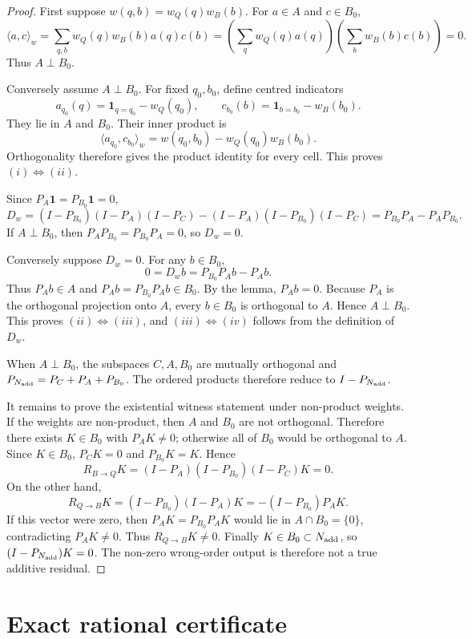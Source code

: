 \documentclass[11pt]{article}
\theoremstyle{remark}
\newcommand{\one}{\mathbf{1}}
\newcommand{\ip}[2]{\langle #1,#2\rangle_w}
\newcommand{\RQBt}{R_{Q\to B}}
\newcommand{\RBQt}{R_{B\to Q}}
\begin{document}
\begin{proof}
First suppose $w(q,b)=w_Q(q)w_B(b)$. For $a\in A$ and $c\in B_0$,
\[
\ip{a}{c}=\sum_{q,b}w_Q(q)w_B(b)a(q)c(b)
=\left(\sum_q w_Q(q)a(q)\right)
\left(\sum_b w_B(b)c(b)\right)=0.
\]
Thus $A\perp B_0$.

Conversely assume $A\perp B_0$. For fixed $q_0,b_0$, define centred indicators
\[
a_{q_0}(q)=\mathbf{1}_{q=q_0}-w_Q(q_0),\qquad
c_{b_0}(b)=\mathbf{1}_{b=b_0}-w_B(b_0).
\]
They lie in $A$ and $B_0$. Their inner product is
\[
\ip{a_{q_0}}{c_{b_0}}
=w(q_0,b_0)-w_Q(q_0)w_B(b_0).
\]
Orthogonality therefore gives the product identity for every cell. This proves $(i)\Leftrightarrow(ii)$.

Since $P_A\one=P_{B_0}\one=0$,
\[
D_w=(I-P_{B_0})(I-P_A)(I-P_C)-(I-P_A)(I-P_{B_0})(I-P_C)
=P_{B_0}P_A-P_AP_{B_0}.
\]
If $A\perp B_0$, then $P_AP_{B_0}=P_{B_0}P_A=0$, so $D_w=0$.

Conversely suppose $D_w=0$. For any $b\in B_0$,
\[
0=D_wb=P_{B_0}P_Ab-P_Ab.
\]
Thus $P_Ab\in A$ and $P_Ab=P_{B_0}P_Ab\in B_0$. By the lemma, $P_Ab=0$. Because $P_A$ is the orthogonal projection onto $A$, every $b\in B_0$ is orthogonal to $A$. Hence $A\perp B_0$. This proves $(ii)\Leftrightarrow(iii)$, and $(iii)\Leftrightarrow(iv)$ follows from the definition of $D_w$.

When $A\perp B_0$, the subspaces $C,A,B_0$ are mutually orthogonal and $P_{N_{\rm add}}=P_C+P_A+P_{B_0}$. The ordered products therefore reduce to $I-P_{N_{\rm add}}$.

It remains to prove the existential witness statement under non-product weights. If the weights are non-product, then $A$ and $B_0$ are not orthogonal. Therefore there exists $K\in B_0$ with $P_AK\neq0$; otherwise all of $B_0$ would be orthogonal to $A$. Since $K\in B_0$, $P_CK=0$ and $P_{B_0}K=K$. Hence
\[
\RBQt K=(I-P_A)(I-P_{B_0})(I-P_C)K=0.
\]
On the other hand,
\[
\RQBt K=(I-P_{B_0})(I-P_A)K=-(I-P_{B_0})P_AK.
\]
If this vector were zero, then $P_AK=P_{B_0}P_AK$ would lie in $A\cap B_0=\{0\}$, contradicting $P_AK\neq0$. Thus $\RQBt K\neq0$. Finally $K\in B_0\subset N_{\rm add}$, so $(I-P_{N_{\rm add}})K=0$. The non-zero wrong-order output is therefore not a true additive residual.
\end{proof}

\section{Exact rational certificate}
\end{document}
